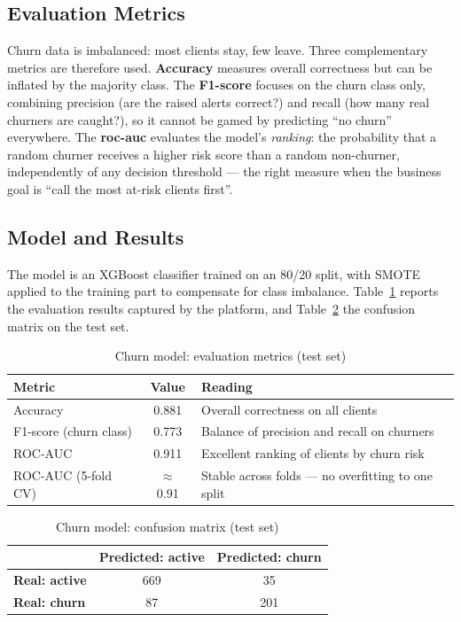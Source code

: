 \subsection{Evaluation Metrics}
Churn data is imbalanced: most clients stay, few leave. Three complementary
metrics are therefore used. \textbf{Accuracy} measures overall correctness but
can be inflated by the majority class. The \textbf{F1-score} focuses on the
churn class only, combining precision (are the raised alerts correct?) and
recall (how many real churners are caught?), so it cannot be gamed by
predicting ``no churn'' everywhere. The \textbf{\gls{roc}-\gls{auc}} evaluates
the model's \emph{ranking}: the probability that a random churner receives a
higher risk score than a random non-churner, independently of any decision
threshold --- the right measure when the business goal is ``call the most
at-risk clients first''.

\subsection{Model and Results}
The model is an XGBoost classifier trained on an 80/20 split, with SMOTE
applied to the training part to compensate for class imbalance.
Table~\ref{tab:churn-metrics} reports the evaluation results captured by the
platform, and Table~\ref{tab:churn-cm} the confusion matrix on the test set.

\begin{table}[H]\centering
\renewcommand{\arraystretch}{1.2}
\caption{Churn model: evaluation metrics (test set)}\label{tab:churn-metrics}
\small
\begin{tabularx}{\textwidth}{|X|c|X|}
\hline
\rowcolor{primary!15}
\textbf{Metric} & \textbf{Value} & \textbf{Reading}\\
\hline
Accuracy & 0.881 & Overall correctness on all clients\\ \hline
F1-score (churn class) & 0.773 & Balance of precision and recall on churners\\ \hline
ROC-AUC & 0.911 & Excellent ranking of clients by churn risk\\ \hline
ROC-AUC (5-fold CV) & $\approx$ 0.91 & Stable across folds --- no overfitting to one split\\ \hline
\end{tabularx}
\end{table}

\begin{table}[H]\centering
\renewcommand{\arraystretch}{1.2}
\caption{Churn model: confusion matrix (test set)}\label{tab:churn-cm}
\small
\begin{tabular}{|l|c|c|}
\hline
\rowcolor{primary!15}
 & \textbf{Predicted: active} & \textbf{Predicted: churn}\\
\hline
\textbf{Real: active} & 669 & 35\\ \hline
\textbf{Real: churn}  & 87  & 201\\ \hline
\end{tabular}
\end{table}

